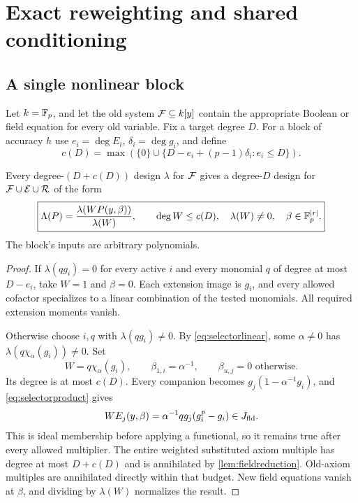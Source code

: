 \chapter{Exact reweighting and shared conditioning}\label{ch:reweighting}

\section{A single nonlinear block}
Let $k=\mathbb F_p$, and let the old system $\mathcal F\subseteq k[y]$ contain the appropriate Boolean or field equation for every old variable. Fix a target degree $D$. For a block of accuracy $h$ use $e_i=\deg E_i$, $\delta_i=\deg g_i$, and define
\begin{equation}\label{eq:repaircost}
 c(D)=\max\left(\{0\}\cup
 \{D-e_i+(p-1)\delta_i:e_i\le D\}\right).
\end{equation}

\begin{lemma}\label{lem:repair}
Every degree-$(D+c(D))$ design $\lambda$ for $\mathcal F$ gives a degree-$D$ design for $\mathcal F\cup\mathcal E\cup\mathcal R$ of the form
\[
 \boxed{\Lambda(P)=\frac{\lambda(WP(y,\beta))}{\lambda(W)},\qquad
 \deg W\le c(D),\quad\lambda(W)\ne0,\quad\beta\in\mathbb F_p^{|r|}.}
\]
The block's inputs are arbitrary polynomials.
\end{lemma}
\begin{proof}
If $\lambda(qg_i)=0$ for every active $i$ and every monomial $q$ of degree at most $D-e_i$, take $W=1$ and $\beta=0$. Each extension image is $g_i$, and every allowed cofactor specializes to a linear combination of the tested monomials. All required extension moments vanish.

Otherwise choose $i,q$ with $\lambda(qg_i)\ne0$. By \eqref{eq:selectorlinear}, some $\alpha\ne0$ has $\lambda(q\chi_\alpha(g_i))\ne0$. Set
\[
 W=q\chi_\alpha(g_i),\qquad \beta_{1,i}=\alpha^{-1},
 \qquad \beta_{u,j}=0\text{ otherwise}.
\]
Its degree is at most $c(D)$. Every companion becomes $g_j(1-\alpha^{-1}g_i)$, and \eqref{eq:selectorproduct} gives
\[
 WE_j(y,\beta)=\alpha^{-1}qg_j(g_i^p-g_i)\in J_{\mathrm{fld}}.
\]
This is ideal membership before applying a functional, so it remains true after every allowed multiplier. The entire weighted substituted axiom multiple has degree at most $D+c(D)$ and is annihilated by \cref{lem:fieldreduction}. Old-axiom multiples are annihilated directly within that budget. New field equations vanish at $\beta$, and dividing by $\lambda(W)$ normalizes the result.
\end{proof}

